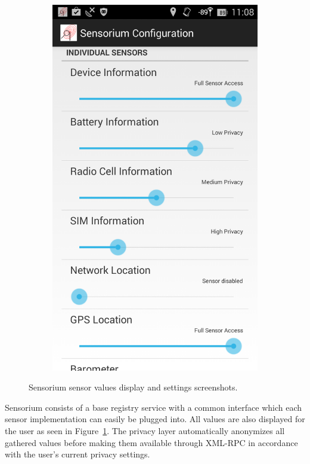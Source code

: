 \begin{figure}[htb]
\begin{subfigure}[b]{0.45\textwidth}
			\centering
			\includegraphics[width=\textwidth]{images/sensorium-settings.png}
		   \end{subfigure}%
	\caption{Sensorium sensor values display and settings screenshots.}
\label{c5:fig:sensorium}
\end{figure}

Sensorium consists of a base registry service with a common interface which each sensor implementation can easily be plugged into. All values are also displayed for the user as seen in Figure~\ref{c5:fig:sensorium}. The privacy layer automatically anonymizes all gathered values before making them available through XML-RPC in accordance with the user's current privacy settings.

